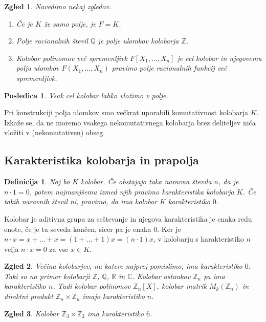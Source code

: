 \documentclass[10pt, a4paper]{article}
\newtheorem{posledica}[izr]{Posledica}
\newtheorem{defi}{Definicija}[section]
\newenvironment{noticeB}{%
  \tcolorbox[%
  notitle,
  empty,
  enhanced,  %
  breakable,
  coltext=black,
  colback=white, 
  fontupper=\rmfamily,
  noparskip,
  sharp corners,
  boxrule=-1pt,  %
  frame hidden,
  left=7pt,  %
  right=7pt,
  top=5pt,
  bottom=5pt,
  before skip=2.5ex plus 2pt,
  after skip=2.5ex plus 2pt,
  borderline west = {1.5pt}{-0.1pt}{blue!30!black}, %
  overlay unbroken and last={%
    \draw[color=black, line width=1.25pt]
    ($(frame.south west)+(1.pt, -0.1pt)$) -- ++(2em, 0);
  }
  ]}
{\endtcolorbox}
\newenvironment{definicija}{\begin{noticeB}\begin{defi}}{%
    \end{defi}\end{noticeB}}
\newtheorem{zgled}{Zgled}[section]
\newcommand{\Z}{\mathbb {Z}}
\newcommand{\Q}{\mathbb {Q}}
\newcommand{\R}{\mathbb {R}}
\newcommand{\C}{\mathbb {C}}
\begin{document}
\begin{zgled}
  Navedimo nekaj zgledov.
  \begin{enumerate}
    \item Če je $K$ že samo polje, je $F = K$.
    \item Polje racionalnih števil $\Q$ je polje ulomkov kolobarja $\Z$.
    \item Kolobar polinomov več spremenljivk $F[X_1, \dots, X_n]$ je cel kolobar in njegovemu polju ulomkov 
    $F(X_1, \dots, X_n)$ pravimo polje racionalnih funkcij več spremenljivk.
  \end{enumerate}
\end{zgled}

\begin{posledica}
  Vsak cel kolobar lahko vložimo v polje.
\end{posledica}

Pri konstrukciji polja ulomkov smo večkrat uporabili komutativnost kolobarja $K$.
Izkaže se, da ne moremo vsakega nekomutativnega kolobarja brez deliteljev niča vložiti v (nekomutativen)
obseg.

\subsection{Karakteristika kolobarja in prapolja}

\begin{definicija}
  Naj bo $K$ kolobar. Če obstajajo taka naravna števila $n$, da je $n \cdot 1 = 0$,
  potem najmanjšemu izmed njih pravimo karakteristika kolobarja $K$.
  Če takih naravnih števil ni, pravimo, da ima kolobar $K$ karakteristiko $0$.
\end{definicija}

Kolobar je aditivna grupa za seštevanje in njegova karakteristika je enaka redu enote,
če je ta seveda končen, sicer pa je enaka $0$.
Ker je $n \cdot x = x + \dots + x = (1 + \dots + 1)x = (n \cdot 1)x$,
v kolobarju s karakteristiko $n$ velja $n \cdot x = 0$ za vse $x \in K$.

\begin{zgled}
  Večina kolobarjev, na katere najprej pomislimo, ima karakteristiko 
  $0$. Taki so na primer kolobarji $\Z$, $\Q$, $\R$ in $\C$.
  Kolobar ostankov $\Z_n$ pa ima karakteristiko $n$.
  Tudi kolobar polinomov $\Z_n [X]$, kolobar matrik $M_k (\Z_n)$
  in direktni produkt $\Z_n \times \Z_n$ imajo karakteristiko $n$.
\end{zgled}

\begin{zgled}
  Kolobar $\Z_3 \times \Z_2$ ima karakteristiko $6$.
\end{zgled}
\end{document}
